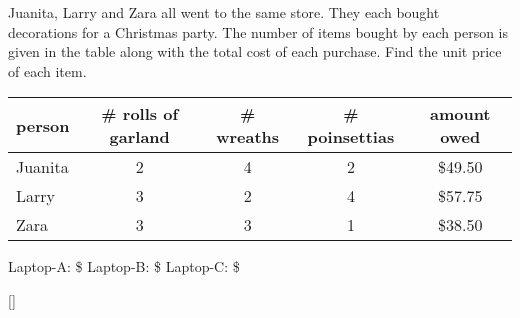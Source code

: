 \documentclass[12pt,letterpaper]{memoir}
\begin{document}
%
%
\myWideProblemWithContent
{
    Juanita, Larry and Zara all went to the same store.
    They each bought decorations for a
    Christmas party. 
    The number of items bought by each person is given in the table
    along with the total cost of each purchase. 
    Find the unit price of each item. 
    \begin{center}
        \small
        \begin{tabular}{lcccc}
            person & \# rolls of garland & \# wreaths & \# poinsettias & amount owed \\
            \toprule
            Juanita  & 2  & 4 & 2 & \$49.50  \\
            Larry    & 3  & 2 & 4 & \$57.75  \\
            Zara     & 3  & 3 & 1 & \$38.50  \\
        \end{tabular}
    \end{center}
    \myBetterSystemTable
    \small
    Laptop-A: \$
    \hfill 
    Laptop-B: \$
    \hfill 
    Laptop-C: \$
}[\small]
\end{document}
